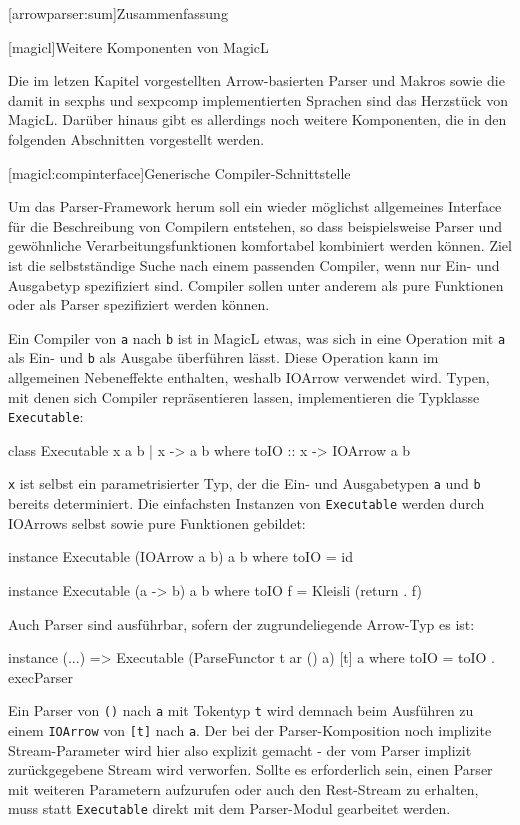 \documentclass[11pt, a4paper, bibgerm]{scrbook}
\newcommand\icode[1]{\lstinline?#1?}
\newcommand\lchapter{}
\newcommand\lsection{}
\newcommand\cref{}
\begin{document}
\lsection[arrowparser:sum]{Zusammenfassung}

\lchapter[magicl]{Weitere Komponenten von MagicL}

Die im letzen Kapitel vorgestellten Arrow-basierten Parser und Makros
sowie die damit in \cref{sexphs} und \cref{sexpcomp} implementierten
Sprachen sind das Herzstück von MagicL. Darüber hinaus gibt es
allerdings noch weitere Komponenten, die in den folgenden Abschnitten
vorgestellt werden.

\lsection[magicl:compinterface]{Generische Compiler-Schnittstelle}

Um das Parser-Framework herum soll ein wieder möglichst allgemeines
Interface für die Beschreibung von Compilern entstehen, so dass
beispielsweise Parser und gewöhnliche Verarbeitungsfunktionen
komfortabel kombiniert werden können. Ziel ist die selbstständige Suche
nach einem passenden Compiler, wenn nur Ein- und Ausgabetyp spezifiziert
sind. Compiler sollen unter anderem als pure Funktionen oder als Parser
spezifiziert werden können.

Ein Compiler von \icode{a} nach \icode{b} ist in MagicL etwas, was sich
in eine Operation mit \icode{a} als Ein- und \icode{b} als Ausgabe
überführen lässt. Diese Operation kann im allgemeinen Nebeneffekte
enthalten, weshalb IOArrow verwendet wird. Typen, mit denen sich
Compiler repräsentieren lassen, implementieren die Typklasse
\icode{Executable}:
\begin{code}
class Executable x a b | x -> a b where
  toIO :: x -> IOArrow a b
\end{code}
\icode{x} ist selbst ein parametrisierter Typ, der die Ein- und
Ausgabetypen \icode{a} und \icode{b} bereits determiniert. Die einfachsten
Instanzen von \icode{Executable} werden durch IOArrows selbst sowie pure
Funktionen gebildet:
\begin{code}
instance Executable (IOArrow a b) a b where
  toIO = id

instance Executable (a -> b) a b where
  toIO f = Kleisli (return . f)
\end{code}
Auch Parser sind ausführbar, sofern der zugrundeliegende Arrow-Typ es
ist:
\begin{code}
instance (...) => Executable (ParseFunctor t ar () a) [t] a where
  toIO = toIO . execParser
\end{code}
Ein Parser von \icode{()} nach \icode{a} mit Tokentyp \icode{t} wird
demnach beim Ausführen zu einem \icode{IOArrow} von \icode{[t]} nach
\icode{a}. Der bei der Parser-Komposition noch implizite
Stream-Parameter wird hier also explizit gemacht - der vom Parser
implizit zurückgegebene Stream wird verworfen. Sollte es erforderlich
sein, einen Parser mit weiteren Parametern aufzurufen oder auch den
Rest-Stream zu erhalten, muss statt \icode{Executable} direkt mit dem
Parser-Modul gearbeitet werden.
\end{document}
